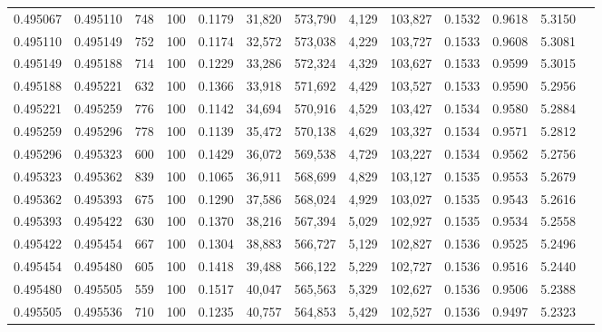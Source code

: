 \begin{tabular}{rrrrrrrrrrrrr}
0.495067 & 0.495110 &   748 & 100 &                                     0.1179 &  31,820 & 573,790 &   4,129 & 103,827 & 0.1532 & 0.9618 & 5.3150 \\
0.495110 & 0.495149 &   752 & 100 &                                     0.1174 &  32,572 & 573,038 &   4,229 & 103,727 & 0.1533 & 0.9608 & 5.3081 \\
0.495149 & 0.495188 &   714 & 100 &                                     0.1229 &  33,286 & 572,324 &   4,329 & 103,627 & 0.1533 & 0.9599 & 5.3015 \\
0.495188 & 0.495221 &   632 & 100 &                                     0.1366 &  33,918 & 571,692 &   4,429 & 103,527 & 0.1533 & 0.9590 & 5.2956 \\
0.495221 & 0.495259 &   776 & 100 &                                     0.1142 &  34,694 & 570,916 &   4,529 & 103,427 & 0.1534 & 0.9580 & 5.2884 \\
0.495259 & 0.495296 &   778 & 100 &                                     0.1139 &  35,472 & 570,138 &   4,629 & 103,327 & 0.1534 & 0.9571 & 5.2812 \\
0.495296 & 0.495323 &   600 & 100 &                                     0.1429 &  36,072 & 569,538 &   4,729 & 103,227 & 0.1534 & 0.9562 & 5.2756 \\
0.495323 & 0.495362 &   839 & 100 &                                     0.1065 &  36,911 & 568,699 &   4,829 & 103,127 & 0.1535 & 0.9553 & 5.2679 \\
0.495362 & 0.495393 &   675 & 100 &                                     0.1290 &  37,586 & 568,024 &   4,929 & 103,027 & 0.1535 & 0.9543 & 5.2616 \\
0.495393 & 0.495422 &   630 & 100 &                                     0.1370 &  38,216 & 567,394 &   5,029 & 102,927 & 0.1535 & 0.9534 & 5.2558 \\
0.495422 & 0.495454 &   667 & 100 &                                     0.1304 &  38,883 & 566,727 &   5,129 & 102,827 & 0.1536 & 0.9525 & 5.2496 \\
0.495454 & 0.495480 &   605 & 100 &                                     0.1418 &  39,488 & 566,122 &   5,229 & 102,727 & 0.1536 & 0.9516 & 5.2440 \\
0.495480 & 0.495505 &   559 & 100 &                                     0.1517 &  40,047 & 565,563 &   5,329 & 102,627 & 0.1536 & 0.9506 & 5.2388 \\
0.495505 & 0.495536 &   710 & 100 &                                     0.1235 &  40,757 & 564,853 &   5,429 & 102,527 & 0.1536 & 0.9497 & 5.2323 \\

\end{tabular}
